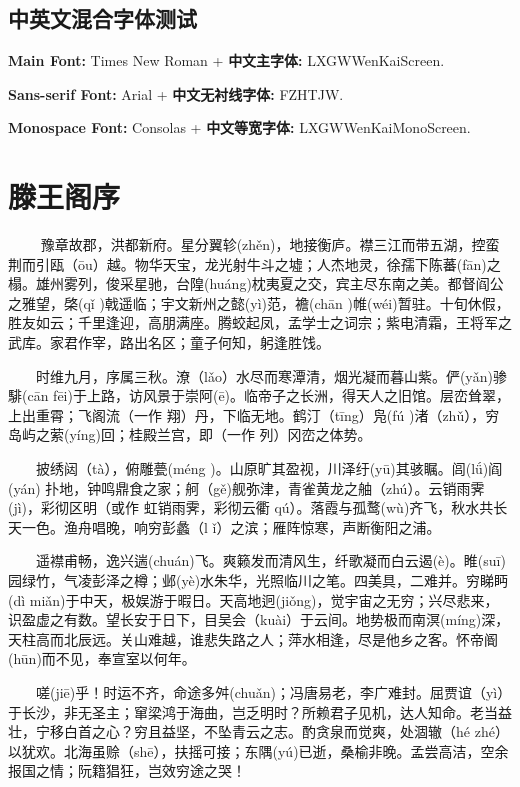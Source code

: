 \documentclass[fontset=none]{ctexart}
\begin{document}
\subsection{中英文混合字体测试}
\textbf{Main Font:} Times New Roman + \textbf{中文主字体:} LXGWWenKaiScreen.  
\par
{\sffamily \textbf{Sans-serif Font:} Arial + \textbf{中文无衬线字体:} FZHTJW.}  
\par
{\ttfamily \textbf{Monospace Font:} Consolas + \textbf{中文等宽字体:} LXGWWenKaiMonoScreen.}

\section{滕王阁序}
　　 豫章故郡，洪都新府。星分翼轸(zhěn)，地接衡庐。襟三江而带五湖，控蛮荆而引瓯（ōu）越。物华天宝，龙光射牛斗之墟；人杰地灵，徐孺下陈蕃(fān)之榻。雄州雾列，俊采星驰，台隍(huáng)枕夷夏之交，宾主尽东南之美。都督阎公之雅望，棨(qǐ )戟遥临；宇文新州之懿(yì)范，襜(chān )帷(wéi)暂驻。十旬休假，胜友如云；千里逢迎，高朋满座。腾蛟起凤，孟学士之词宗；紫电清霜，王将军之武库。家君作宰，路出名区；童子何知，躬逢胜饯。

　　时维九月，序属三秋。潦（lǎo）水尽而寒潭清，烟光凝而暮山紫。俨(yǎn)骖騑(cān fēi)于上路，访风景于崇阿(ē)。临帝子之长洲，得天人之旧馆。层峦耸翠，上出重霄；飞阁流（一作 翔）丹，下临无地。鹤汀（tīng）凫(fú )渚（zhǔ），穷岛屿之萦(yíng)回；桂殿兰宫，即（一作 列）冈峦之体势。

　　披绣闼（tà），俯雕甍(méng )。山原旷其盈视，川泽纡(yū)其骇瞩。闾(lǘ)阎(yán) 扑地，钟鸣鼎食之家；舸（gě)舰弥津，青雀黄龙之舳（zhú）。云销雨霁(jì)，彩彻区明（或作 虹销雨霁，彩彻云衢 qú）。落霞与孤鹜(wù)齐飞，秋水共长天一色。渔舟唱晚，响穷彭蠡（l ǐ）之滨；雁阵惊寒，声断衡阳之浦。

　　遥襟甫畅，逸兴遄(chuán)飞。爽籁发而清风生，纤歌凝而白云遏(è)。睢(suī)园绿竹，气凌彭泽之樽；邺(yè)水朱华，光照临川之笔。四美具，二难并。穷睇眄(dì miǎn)于中天，极娱游于暇日。天高地迥(jiǒng)，觉宇宙之无穷；兴尽悲来，识盈虚之有数。望长安于日下，目吴会（kuài）于云间。地势极而南溟(míng)深，天柱高而北辰远。关山难越，谁悲失路之人；萍水相逢，尽是他乡之客。怀帝阍(hūn)而不见，奉宣室以何年。

　　嗟(jiē)乎！时运不齐，命途多舛(chuǎn)；冯唐易老，李广难封。屈贾谊（yì）于长沙，非无圣主；窜梁鸿于海曲，岂乏明时？所赖君子见机，达人知命。老当益壮，宁移白首之心？穷且益坚，不坠青云之志。酌贪泉而觉爽，处涸辙（hé zhé）以犹欢。北海虽赊（shē），扶摇可接；东隅(yú)已逝，桑榆非晚。孟尝高洁，空余报国之情；阮籍猖狂，岂效穷途之哭！
\end{document}
